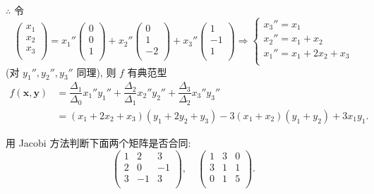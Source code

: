 \documentclass[color=black,device=normal,lang=cn,mode=geye]{elegantnote}
\begin{document}
\begin{solution}
    $\therefore$ 令
    \[\begin{pmatrix}
        x_1 \\
        x_2 \\
        x_3 \\
    \end{pmatrix}=x_1''\begin{pmatrix}
        0 \\
        0 \\
        1 \\
    \end{pmatrix}+x_2''\begin{pmatrix}
        0 \\
        1 \\
        -2 \\
    \end{pmatrix}+x_3''\begin{pmatrix}
        1 \\
        -1 \\
        1 \\
    \end{pmatrix}\Rightarrow\begin{cases}
        x_3''=x_1 \\
        x_2''=x_1+x_2 \\
        x_1''=x_1+2x_2+x_3 \\
    \end{cases}\]
    (对 $y_1'',y_2'',y_3''$ 同理), 则 $f$ 有典范型
    \begin{align*}
        f(\boldsymbol{x},\boldsymbol{y}) & =\dfrac{\Delta_1}{\Delta_0}x_1''y_1''+\dfrac{\Delta_2}{\Delta_1}x_2''y_2''+\dfrac{\Delta_3}{\Delta_2}x_3''y_3'' \\
        & =(x_1+2x_2+x_3)(y_1+2y_2+y_3)-3(x_1+x_2)(y_1+y_2)+3x_1y_1.
    \end{align*}
\end{solution}
\begin{exercisec}[1.7.4]
    用 Jacobi 方法判断下面两个矩阵是否合同:
    \[\begin{pmatrix}
        1 & 2 & 3 \\
        2 & 0 & -1 \\
        3 & -1 & 3 \\
    \end{pmatrix},\quad\begin{pmatrix}
        1 & 3 & 0 \\
        3 & 1 & 1 \\
        0 & 1 & 5 \\
    \end{pmatrix}.\]
\end{exercisec}
\end{document}
